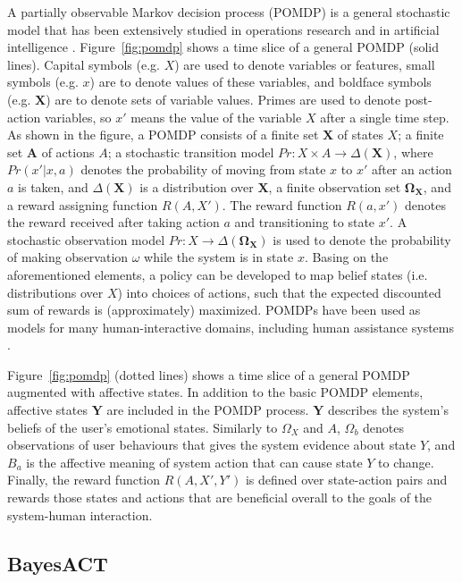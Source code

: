 A partially observable Markov decision process (POMDP) is a general stochastic model that has been extensively studied in operations research and in artificial intelligence \cite{monahan1982state, poupart2011introduction}. Figure~\ref{fig:pomdp} shows a time slice of a general POMDP (solid lines). Capital symbols (e.g. $X$) are used to denote variables or features, small symbols (e.g. $x$) are to denote values of these variables, and boldface symbols (e.g. $\mathbf{X}$) are to denote sets of variable values. Primes are used to denote post-action variables, so $x'$ means the value of the variable $X$ after a single time step. As shown in the figure, a POMDP consists of a finite set $\mathbf{X}$ of states $X$; a finite set $\mathbf{A}$ of actions $A$; a stochastic transition model $Pr : X \times A \to \Delta(\mathbf{X})$, where $Pr(x'|x, a)$ denotes the probability of moving from state $x$ to $x'$ after an action $a$ is taken, and $\Delta(\mathbf{X})$ is a distribution over $\mathbf{X}$, a finite observation set $\mathbf{\Omega_{X}}$, and a reward assigning function $R(A, X')$. The reward function $R(a, x')$ denotes the reward received after taking action $a$ and transitioning to state $x'$. A stochastic observation model $Pr : X \to \Delta(\mathbf{\Omega_{X}})$ is used to denote the probability of making observation $\omega$ while the system is in state $x$. Basing on the aforementioned elements, a policy can be developed to map belief states (i.e. distributions over $X$) into choices of actions, such that the expected discounted sum of rewards is (approximately) maximized. POMDPs have been used as models for many human-interactive domains, including human assistance systems \cite{hoey2010automated}.

Figure~\ref{fig:pomdp} (dotted lines) shows a time slice of a general POMDP augmented with affective states. In addition to the basic POMDP elements, affective states $\mathbf{Y}$ are included in the POMDP process. $\mathbf{Y}$ describes the system's beliefs of the user's emotional states. Similarly to $\Omega_{X}$ and $A$, $\Omega_{b}$ denotes observations of user behaviours that gives the system evidence about state $Y$, and $B_{a}$ is the affective meaning of system action that can cause state $Y$ to change. Finally, the reward function $R(A, X', Y')$ is defined over state-action pairs and rewards those states and actions that are beneficial overall to the goals of the system-human interaction. 

\subsection{BayesACT}

